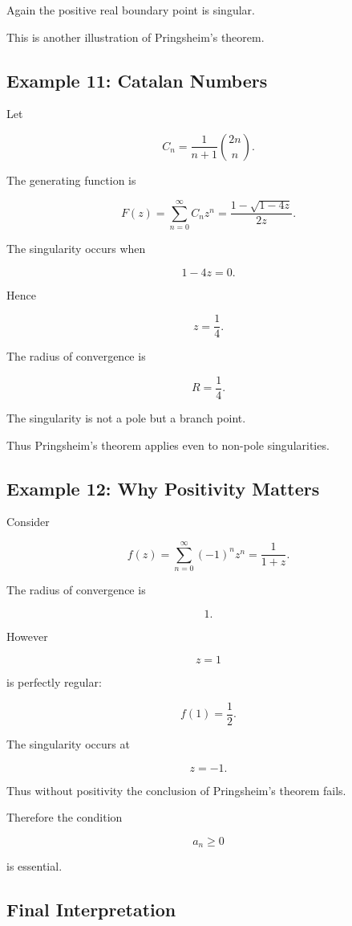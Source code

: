 \documentclass[12pt,a4paper]{article}
\theoremstyle{notespace}
\begin{document}
Again the positive real boundary point is singular.

This is another illustration of Pringsheim's theorem.

\bigskip

\subsection{Example 11: Catalan Numbers}

Let

\[
C_n
=
\frac1{n+1}
\binom{2n}{n}.
\]

The generating function is

\[
F(z)
=
\sum_{n=0}^{\infty}
C_n z^n
=
\frac{1-\sqrt{1-4z}}{2z}.
\]

The singularity occurs when

\[
1-4z=0.
\]

Hence

\[
z=\frac14.
\]

The radius of convergence is

\[
R=\frac14.
\]

The singularity is not a pole but a branch point.

Thus Pringsheim's theorem applies even to non-pole singularities.

\bigskip

\subsection{Example 12: Why Positivity Matters}

Consider

\[
f(z)
=
\sum_{n=0}^{\infty}
(-1)^n z^n
=
\frac1{1+z}.
\]

The radius of convergence is

\[
1.
\]

However

\[
z=1
\]

is perfectly regular:

\[
f(1)=\frac12.
\]

The singularity occurs at

\[
z=-1.
\]

Thus without positivity the conclusion of Pringsheim's theorem fails.

Therefore the condition

\[
a_n\ge0
\]

is essential.

\bigskip

\subsection{Final Interpretation}
\end{document}
